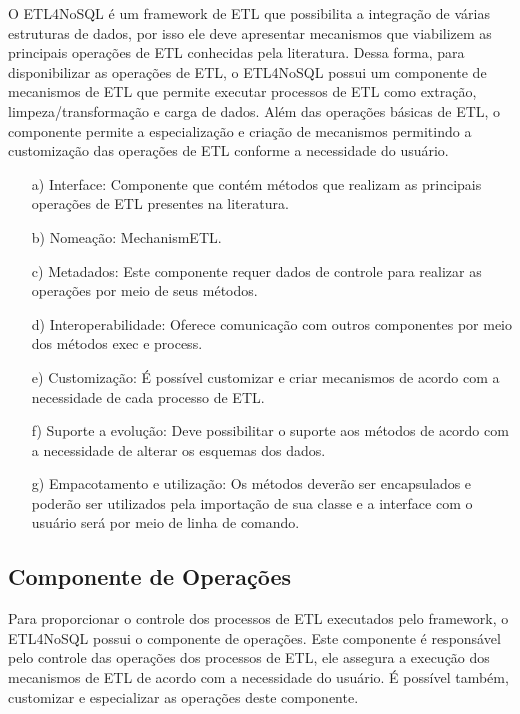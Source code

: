 O ETL4NoSQL é um framework de ETL que possibilita a integração de várias estruturas de dados, por isso ele deve apresentar mecanismos que viabilizem as principais operações de ETL conhecidas pela literatura. Dessa forma, para disponibilizar as operações de ETL, o ETL4NoSQL possui um componente de mecanismos de ETL que permite executar processos de ETL como extração, limpeza/transformação e carga de dados. Além das operações básicas de ETL, o componente permite a especialização e criação de mecanismos permitindo a customização das operações de ETL conforme a necessidade do usuário.

\begin{itemize}
	\item[a)] Interface: Componente que contém métodos que realizam as principais operações de ETL presentes na literatura. 
	
	\item[b)] Nomeação: MechanismETL.
	
	\item[c)] Metadados: Este componente requer dados de controle para realizar as operações por meio de seus métodos.
	
	\item[d)] Interoperabilidade: Oferece comunicação com outros componentes por meio dos métodos exec e process.
	
	
	
	\item[e)] Customização: É possível customizar e criar mecanismos de acordo com a necessidade de cada processo de ETL.
	
	\item[f)] Suporte a evolução: Deve possibilitar o suporte aos métodos de acordo com a necessidade de alterar os esquemas dos dados.
	
	\item[g)] Empacotamento e utilização: Os métodos deverão ser encapsulados e poderão ser utilizados pela importação de sua classe e a interface com o usuário será por meio de linha de comando.
	
\end{itemize}

\subsection{Componente de Operações}

Para proporcionar o controle dos processos de ETL executados pelo framework, o ETL4NoSQL possui o componente de operações. Este componente é responsável pelo controle das operações dos processos de ETL, ele assegura a execução dos mecanismos de ETL de acordo com a necessidade do usuário. É possível também, customizar e especializar as operações deste componente.

